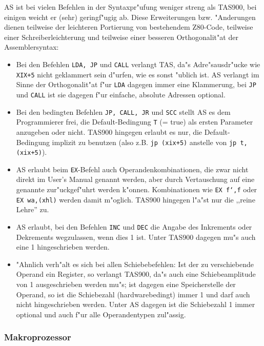 \documentclass[12pt,a4paper,twoside]{report}
\newcommand{\tty}[1]{{\tt #1}}
\begin{document}
AS ist bei vielen Befehlen in der Syntaxpr"ufung weniger streng als TAS900,
bei einigen weicht er (sehr) geringf"ugig ab.  Diese Erweiterungen bzw.
"Anderungen dienen teilweise der leichteren Portierung von bestehendem
Z80-Code, teilweise einer Schreiberleichterung und teilweise einer besseren
Orthogonalit"at der Assemblersyntax:
\begin{itemize}
\item{Bei den Befehlen \tty{LDA, JP} und \tty{CALL} verlangt TAS, da"s
      Adre"sausdr"ucke wie \tty{XIX+5} nicht geklammert sein d"urfen, wie
      es sonst "ublich ist.  AS verlangt im Sinne der Orthogonalit"at f"ur
      \tty{LDA} dagegen immer eine Klammerung, bei \tty{JP} und \tty{CALL}
      ist sie dagegen f"ur einfache, absolute Adressen optional.}
\item{Bei den bedingten Befehlen \tty{JP, CALL, JR} und \tty{SCC} stellt
      AS es dem Programmierer frei, die Default-Bedingung \tty{T} (= true) als
      ersten Parameter anzugeben oder nicht.  TAS900 hingegen erlaubt es
      nur, die Default-Bedingung implizit zu benutzen (also z.B.
      \tty{jp (xix+5)} anstelle von \tty{jp t,(xix+5)}).}
\item{AS erlaubt beim \tty{EX}-Befehl auch Operandenkombinationen, die
      zwar nicht direkt im User's Manual\cite{Tosh900} genannt werden,
      aber durch Vertauschung auf eine genannte zur"uckgef"uhrt werden
      k"onnen.  Kombinationen wie \tty{EX f`,f} oder \tty{EX wa,(xhl)}
      werden damit m"oglich.  TAS900 hingegen l"a"st nur die ,,reine Lehre''
      zu.}
\item{AS erlaubt, bei den Befehlen \tty{INC} und \tty{DEC} die Angabe
      des Inkrements oder Dekrements wegzulassen, wenn dies 1 ist.  Unter
      TAS900 dagegen mu"s auch eine 1 hingeschrieben werden.}
\item{"Ahnlich verh"alt es sich bei allen Schiebebefehlen: Ist der zu
      verschiebende Operand ein Register, so verlangt TAS900, da"s auch
      eine Schiebeamplitude von 1 ausgeschrieben werden mu"s; ist dagegen
      eine Speicherstelle der Operand, so ist die Schiebezahl
      (hardwarebedingt) immer 1 und darf auch nicht hingeschrieben werden.
      Unter AS dagegen ist die Schiebezahl 1 immer optional und auch f"ur
      alle Operandentypen zul"assig.}
\end{itemize}

\subsubsection{Makroprozessor}
\end{document}
